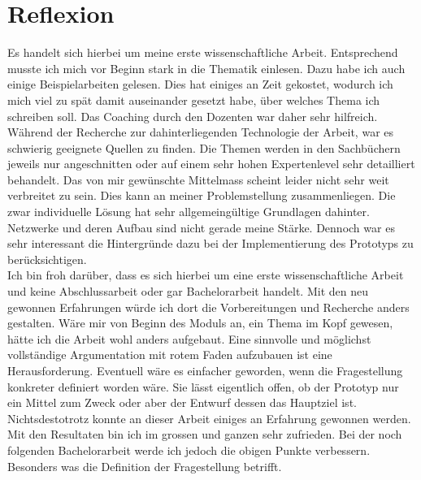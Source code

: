 \chapter{Reflexion}
Es handelt sich hierbei um meine erste wissenschaftliche Arbeit. 
Entsprechend musste ich mich vor Beginn stark in die Thematik einlesen. Dazu habe ich auch einige Beispielarbeiten gelesen.
Dies hat einiges an Zeit gekostet, wodurch ich mich viel zu spät damit auseinander gesetzt habe, 
über welches Thema ich schreiben soll. Das Coaching durch den Dozenten war daher sehr hilfreich. 
Während der Recherche zur dahinterliegenden Technologie der Arbeit, war es schwierig geeignete Quellen zu finden.
Die Themen werden in den Sachbüchern jeweils nur angeschnitten oder auf einem sehr hohen Expertenlevel sehr detailliert behandelt.
Das von mir gewünschte Mittelmass scheint leider nicht sehr weit verbreitet zu sein.
Dies kann an meiner Problemstellung zusammenliegen. Die zwar individuelle Lösung hat sehr allgemeingültige Grundlagen dahinter.
Netzwerke und deren Aufbau sind nicht gerade meine Stärke. 
Dennoch war es sehr interessant die Hintergründe dazu bei der Implementierung des Prototyps zu berücksichtigen.
\\
Ich bin froh darüber, dass es sich hierbei um eine erste wissenschaftliche Arbeit und keine Abschlussarbeit oder gar Bachelorarbeit handelt.
Mit den neu gewonnen Erfahrungen würde ich dort die Vorbereitungen und Recherche anders gestalten. 
Wäre mir von Beginn des Moduls an, ein Thema im Kopf gewesen, hätte ich die Arbeit wohl anders aufgebaut. 
Eine sinnvolle und möglichst vollständige Argumentation mit rotem Faden aufzubauen ist eine Herausforderung. 
Eventuell wäre es einfacher geworden, wenn die Fragestellung konkreter definiert worden wäre. 
Sie lässt eigentlich offen, ob der Prototyp nur ein Mittel zum Zweck oder aber der Entwurf dessen das Hauptziel ist. 
\\
Nichtsdestotrotz konnte an dieser Arbeit einiges an Erfahrung gewonnen werden. Mit den Resultaten bin ich im grossen und ganzen sehr zufrieden.
Bei der noch folgenden Bachelorarbeit werde ich jedoch die obigen Punkte verbessern. Besonders was die Definition der Fragestellung betrifft.